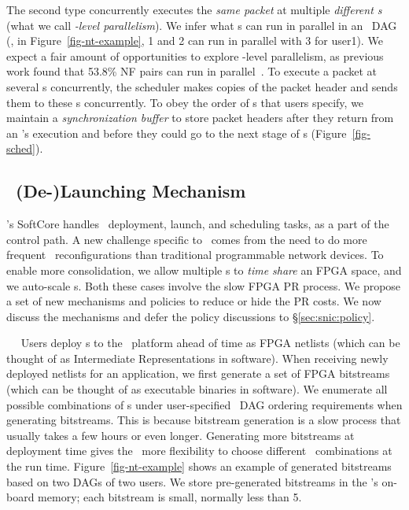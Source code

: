 The second type concurrently executes the {\em same packet} at multiple {\em different \nt{}s} (what we call {\em \nt-level parallelism}).
We infer what \nt{}s can run in parallel in an \nt\ DAG (\eg, in Figure~\ref{fig-nt-example}, \nt{}1 and \nt{}2 can run in parallel with \nt{}3 for user1).
We expect a fair amount of opportunities to explore \nt-level parallelism, as previous work found that 53.8\% NF pairs can run in parallel~\cite{NFP-sigcomm17}.
To execute a packet at several \nt{}s concurrently, the scheduler makes copies of the packet header and sends them to these \nt{}s concurrently. To obey the order of \nt{}s that users specify, we maintain a {\em synchronization buffer} to store packet headers after they return from an \nt{}'s execution and before they could go to the next stage of \nt{}s (Figure~\ref{fig-sched}).

\subsection{\nt\ (De-)Launching Mechanism}
\label{sec:snic:ntsched}
\snic's SoftCore handles \nt\ deployment, launch, and scheduling tasks, as a part of the control path.
A new challenge specific to \snic\ comes from the need to do more frequent \nt\ reconfigurations than traditional programmable network devices.
To enable more consolidation, we allow multiple \nt{}s to {\em time share} an FPGA space, and we auto-scale \nt{}s.
Both these cases involve the slow FPGA PR process.
We propose a set of new mechanisms and policies to reduce or hide the PR costs.
We now discuss the mechanisms and defer the policy discussions to \S\ref{sec:snic:policy}.

~~
Users deploy \nt{}s to the \snic\ platform ahead of time as FPGA netlists (which can be thought of as Intermediate Representations in software).
When receiving newly deployed \nt{} netlists for an application, we first generate a set of FPGA bitstreams (which can be thought of as executable binaries in software).
We enumerate all possible combinations of \nt{}s under user-specified \nt\ DAG ordering requirements when generating bitstreams. 
This is because bitstream generation is a slow process that usually takes a few hours or even longer. 
Generating more bitstreams at deployment time gives the \snic\ more flexibility to choose different \nt\ combinations at the run time. 
Figure~\ref{fig-nt-example} shows an example of generated bitstreams based on two DAGs of two users.
We store pre-generated bitstreams in the \snic{}'s on-board memory; each bitstream is small, normally less than 5\MB.

